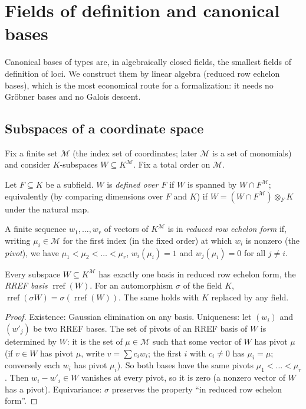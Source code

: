 \section{Fields of definition and canonical bases}
\label{sec:fod}

Canonical bases of types are, in algebraically closed fields, the smallest fields of
definition of loci.  We construct them by linear algebra (reduced row echelon
bases), which is the most economical route for a formalization: it needs no
Gr\"obner bases and no Galois descent.

\subsection{Subspaces of a coordinate space}

Fix a finite set $\mathcal M$ (the index set of coordinates; later $\mathcal M$ is a set
of monomials) and consider $K$-subspaces $W\subseteq K^{\mathcal M}$.  Fix a total order
on $\mathcal M$.

\begin{definition}\label{def:subspace-defined}
Let $F\subseteq K$ be a subfield.  $W$ is \emph{defined over $F$} if $W$ is spanned
by $W\cap F^{\mathcal M}$; equivalently (by comparing dimensions over $F$ and $K$) if
$W=(W\cap F^{\mathcal M})\otimes_F K$ under the natural map.
\end{definition}

\begin{definition}\label{def:rref}
A finite sequence $w_1,\dots,w_r$ of vectors of $K^{\mathcal M}$ is in \emph{reduced
row echelon form} if, writing $\mu_i\in\mathcal M$ for the first index (in the fixed
order) at which $w_i$ is nonzero (the \emph{pivot}), we have $\mu_1<\mu_2<\dots<\mu_r$,
$w_i(\mu_i)=1$ and $w_j(\mu_i)=0$ for all $j\ne i$.
\end{definition}

\begin{lemma}\label{lem:rref}
Every subspace $W\subseteq K^{\mathcal M}$ has exactly one basis in reduced row echelon
form, the \emph{RREF basis} $\operatorname{rref}(W)$.  For an automorphism $\sigma$ of the
field $K$, $\operatorname{rref}(\sigma W)=\sigma(\operatorname{rref}(W))$.  The same holds
with $K$ replaced by any field.
\end{lemma}
\begin{proof}
Existence: Gaussian elimination on any basis.  Uniqueness: let $(w_i)$ and $(w'_j)$ be
two RREF bases.  The set of pivots of an RREF basis of $W$ is determined by $W$: it is
the set of $\mu\in\mathcal M$ such that some vector of $W$ has pivot $\mu$ (if $v\in W$
has pivot $\mu$, write $v=\sum c_i w_i$; the first $i$ with $c_i\neq0$ has
$\mu_i=\mu$; conversely each $w_i$ has pivot $\mu_i$).  So both bases have the same
pivots $\mu_1<\dots<\mu_r$.  Then $w_i-w'_i\in W$ vanishes at every pivot, so it is
zero (a nonzero vector of $W$ has a pivot).  Equivariance: $\sigma$ preserves the
property ``in reduced row echelon form''.
\end{proof}

